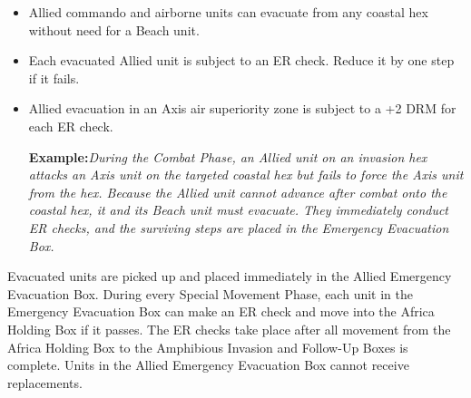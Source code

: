 \begin{itemize}
    \item Allied commando and airborne units can evacuate from any coastal hex without need for a Beach unit.
    \item Each evacuated Allied unit is subject to an ER check. Reduce it by one step if it fails.
    \item Allied evacuation in an Axis air superiority zone is subject to a +2 DRM for each ER check.
    
    \textbf{Example:}\textit{During the Combat Phase, an Allied unit on an invasion hex attacks an Axis unit on the targeted coastal hex but fails to force the Axis unit from the hex. Because the Allied unit cannot advance after combat onto the coastal hex, it and its Beach unit must evacuate. They immediately conduct ER checks, and the surviving steps are placed in the Emergency Evacuation Box.}
\end{itemize}

Evacuated units are picked up and placed immediately in the Allied Emergency Evacuation Box. During every Special Movement Phase, each unit in the Emergency Evacuation Box can make an ER check and move into the Africa Holding Box if it passes. The ER checks take place after all movement from the Africa Holding Box to the Amphibious Invasion and Follow-Up Boxes is complete. Units in the Allied Emergency Evacuation Box cannot receive replacements.